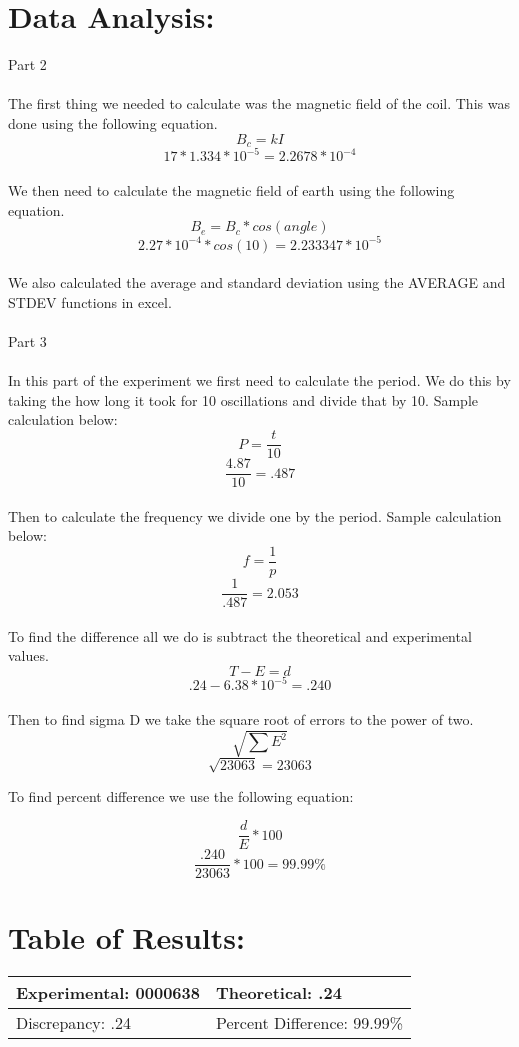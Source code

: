 \documentclass{article}
\begin{document}
\section*{Data Analysis:}
\setcounter{page}{3}
Part 2
\\ \\
The first thing we needed to calculate was the magnetic field of the coil.  This was done using the following equation.
\[B_c=kI\]
\[17 * 1.334*10^{-5} = 2.2678 * 10^{-4}\]
\\
We then need to calculate the magnetic field of earth using the following equation.
\[B_e = B_c * cos(angle)\]
\[2.27 * 10^{-4} * cos(10) = 2.233347 * 10^{-5}\]
\\
We also calculated the average and standard deviation using the AVERAGE and STDEV functions in excel.
\\ \\
Part 3
\\ \\
In this part of the experiment we first need to calculate the period.  We do this by taking the how long it took for 10 oscillations and divide that by 10.  Sample calculation below:
\[P = \frac{t}{10}\]
\[\frac{4.87}{10} = .487\]
\\
Then to calculate the frequency we divide one by the period.  Sample calculation below:
\[f = \frac{1}{p}\]
\[\frac{1}{.487} = 2.053\]
\\
To find the difference all we do is subtract the theoretical and experimental values.
\[T - E = d\]
\[.24 - 6.38 * 10^{-5}=.240\]
\\

Then to find sigma D we take the square root of errors to the power of two.
\[\sqrt{\sum E^2}\]
\[\sqrt{23063} = 23063\]

To find percent difference we use the following equation:

\[\frac{d}{E} * 100\]
\[\frac{.240}{23063} * 100 = 99.99\%\]

\newpage

\section*{Table of Results:}
\begin{center}
\begin{tabular}{|l|l|}
\hline
	Experimental: 0000638 & Theoretical: .24  \\ \hline
	Discrepancy: .24   & Percent Difference: 99.99\% \\
\hline
\end{tabular}
\end{center}
\end{document}
